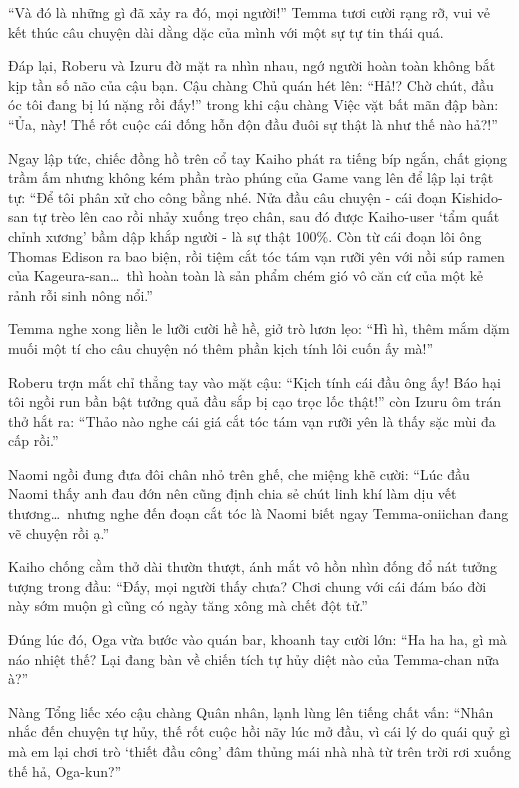 \documentclass[../main.tex]{subfiles}
\begin{document}
\omk

``Và đó là những gì đã xảy ra đó, mọi người!'' Temma tươi cười rạng rỡ, vui vẻ kết thúc câu chuyện dài dằng dặc của mình với một sự tự tin thái quá.

Đáp lại, Roberu và Izuru đờ mặt ra nhìn nhau, ngớ người hoàn toàn không bắt kịp tần số não của cậu bạn. Cậu chàng Chủ quán hét lên: ``Hả!? Chờ chút, đầu óc tôi đang bị lú nặng rồi đấy!'' trong khi cậu chàng Việc vặt bất mãn đập bàn: ``Ủa, này! Thế rốt cuộc cái đống hỗn độn đầu đuôi sự thật là như thế nào hả?!''


Ngay lập tức, chiếc đồng hồ trên cổ tay Kaiho phát ra tiếng bíp ngắn, chất giọng trầm ấm nhưng không kém phần trào phúng của Game vang lên để lập lại trật tự: ``Để tôi phân xử cho công bằng nhé. Nửa đầu câu chuyện - cái đoạn Kishido-san tự trèo lên cao rồi nhảy xuống trẹo chân, sau đó được Kaiho-user `tẩm quất chỉnh xương' bầm dập khắp người - là sự thật 100\%. Còn từ cái đoạn lôi ông Thomas Edison ra bao biện, rồi tiệm cắt tóc tám vạn rưỡi yên với nồi súp ramen của Kageura-san\dots\ thì hoàn toàn là sản phẩm chém gió vô căn cứ của một kẻ rảnh rỗi sinh nông nổi.''

Temma nghe xong liền le lưỡi cười hề hề, giở trò lươn lẹo: ``Hì hì, thêm mắm dặm muối một tí cho câu chuyện nó thêm phần kịch tính lôi cuốn ấy mà!''

Roberu trợn mắt chỉ thẳng tay vào mặt cậu: ``Kịch tính cái đầu ông ấy! Báo hại tôi ngồi run bần bật tưởng quả đầu sắp bị cạo trọc lốc thật!'' còn Izuru ôm trán thở hắt ra: ``Thảo nào nghe cái giá cắt tóc tám vạn rưỡi yên là thấy sặc mùi đa cấp rồi.''

Naomi ngồi đung đưa đôi chân nhỏ trên ghế, che miệng khẽ cười: ``Lúc đầu Naomi thấy anh đau đớn nên cũng định chia sẻ chút linh khí làm dịu vết thương\dots\ nhưng nghe đến đoạn cắt tóc là Naomi biết ngay Temma-oniichan đang vẽ chuyện rồi ạ.''

Kaiho chống cằm thở dài thườn thượt, ánh mắt vô hồn nhìn đống đổ nát tưởng tượng trong đầu: ``Đấy, mọi người thấy chưa? Chơi chung với cái đám báo đời này sớm muộn gì cũng có ngày tăng xông mà chết đột tử.''

Đúng lúc đó, Oga vừa bước vào quán bar, khoanh tay cười lớn: ``Ha ha ha, gì mà náo nhiệt thế? Lại đang bàn về chiến tích tự hủy diệt nào của Temma-chan nữa à?''

Nàng Tổng liếc xéo cậu chàng Quân nhân, lạnh lùng lên tiếng chất vấn: ``Nhân nhắc đến chuyện tự hủy, thế rốt cuộc hồi nãy lúc mở đầu, vì cái lý do quái quỷ gì mà em lại chơi trò `thiết đầu công' đâm thủng mái nhà nhà từ trên trời rơi xuống thế hả, Oga-kun?''
\end{document}
